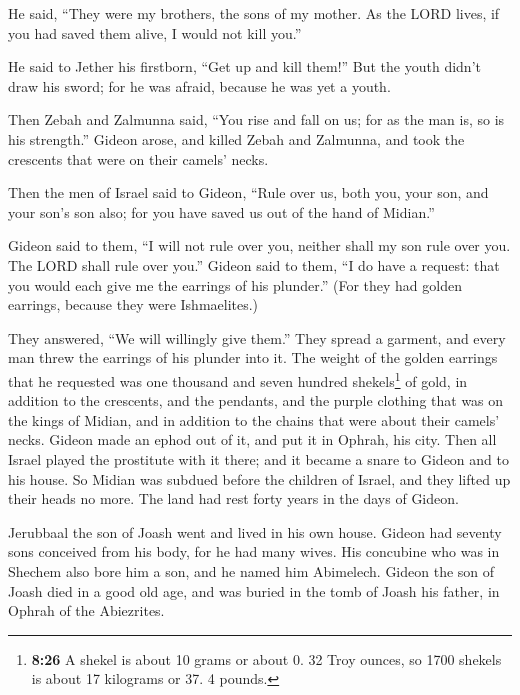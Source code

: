  He said, ``They were my brothers, the sons of my mother.
As the LORD lives, if you had saved them alive, I would not kill you.''

 He said to Jether his firstborn, ``Get up and kill
them!'' But the youth didn't draw his sword; for he was afraid, because
he was yet a youth.

 Then Zebah and Zalmunna said, ``You rise and fall on us;
for as the man is, so is his strength.'' Gideon arose, and killed Zebah
and Zalmunna, and took the crescents that were on their camels' necks.

 Then the men of Israel said to Gideon, ``Rule over us,
both you, your son, and your son's son also; for you have saved us out
of the hand of Midian.''

 Gideon said to them, ``I will not rule over you, neither
shall my son rule over you. The LORD shall rule over you.''
 Gideon said to them, ``I do have a request: that you
would each give me the earrings of his plunder.'' (For they had golden
earrings, because they were Ishmaelites.)

 They answered, ``We will willingly give them.'' They
spread a garment, and every man threw the earrings of his plunder into
it.  The weight of the golden earrings that he requested
was one thousand and seven hundred shekels\footnote{\textbf{8:26} A
  shekel is about 10 grams or about 0. 32 Troy ounces, so 1700 shekels
  is about 17 kilograms or 37. 4 pounds.} of gold, in addition to the
crescents, and the pendants, and the purple clothing that was on the
kings of Midian, and in addition to the chains that were about their
camels' necks.  Gideon made an ephod out of it, and put
it in Ophrah, his city. Then all Israel played the prostitute with it
there; and it became a snare to Gideon and to his house. 
So Midian was subdued before the children of Israel, and they lifted up
their heads no more. The land had rest forty years in the days of
Gideon.

 Jerubbaal the son of Joash went and lived in his own
house.  Gideon had seventy sons conceived from his body,
for he had many wives.  His concubine who was in Shechem
also bore him a son, and he named him Abimelech.  Gideon
the son of Joash died in a good old age, and was buried in the tomb of
Joash his father, in Ophrah of the Abiezrites.

